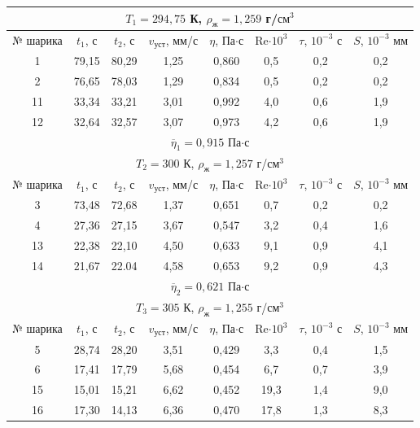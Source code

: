 \documentclass[a4paper,12pt]{article} %
\begin{document}
\begin{table}[]
    \centering
    \begin{tabular}{|c|c|c|c|c|c|c|c|} \hline
        \multicolumn{8}{|c|}{$T_1 = 294,75 $ К, $\rho_\text{ж} = 1,259$ г/$\text{см}^3$} \\ \hline
        № шарика & $t_1$, с & $t_2$, с & $v_\text{уст}$, мм/с & $\eta$, Па$\cdot$с & Re$\cdot 10^3$ & $\tau$, $10^{-3}$ с & $S$, $10^{-3}$ мм  \\ \hline
        1 & 79,15 & 80,29 & 1,25 & 0,860 & 0,5 & 0,2 & 0,2 \\ \hline
        2 & 76,65 & 78,03 & 1,29 & 0,834 & 0,5 & 0,2 & 0,2 \\ \hline
        11 & 33,34 & 33,21 & 3,01 & 0,992 & 4,0 & 0,6 & 1,9 \\ \hline
        12 & 32,64 & 32,57 & 3,07 & 0,973 & 4,2 & 0,6 & 1,9 \\ \hline
        \multicolumn{8}{|c|}{$\overline{\eta}_1 = 0,915$ Па$\cdot$с} \\ \hline
        \multicolumn{8}{|c|}{$T_2 = 300$ К, $\rho_\text{ж} = 1,257$ г/$\text{см}^3$} \\ \hline
        № шарика & $t_1$, с & $t_2$, с & $v_\text{уст}$, мм/с & $\eta$, Па$\cdot$с & Re$\cdot 10^3$ & $\tau$, $10^{-3}$ с & $S$, $10^{-3}$ мм  \\ \hline
        3 & 73,48 & 72,68 & 1,37 & 0,651 & 0,7 & 0,2 & 0,2 \\ \hline
        4 & 27,36 & 27,15 & 3,67 & 0,547 & 3,2 & 0,4 & 1,6 \\ \hline
        13 & 22,38 & 22,10 & 4,50 & 0,633 & 9,1 & 0,9 & 4,1 \\ \hline
        14 & 21,67 & 22.04 & 4,58 & 0,653 & 9,2 & 0,9 & 4,3 \\ \hline
        \multicolumn{8}{|c|}{$\overline{\eta}_2 = 0,621$ Па$\cdot$с} \\ \hline
        \multicolumn{8}{|c|}{$T_3 = 305$ К, $\rho_\text{ж} = 1,255$ г/$\text{см}^3$} \\ \hline
        № шарика & $t_1$, с & $t_2$, с & $v_\text{уст}$, мм/с & $\eta$, Па$\cdot$с & Re$\cdot 10^3$ & $\tau$, $10^{-3}$ с & $S$, $10^{-3}$ мм  \\ \hline
        5 & 28,74 & 28,20 & 3,51 & 0,429 & 3,3 & 0,4 & 1,5 \\ \hline
        6 & 17,41 & 17,79 & 5,68 & 0,454 & 6,7 & 0,7 & 3,9 \\ \hline
        15 & 15,01 & 15,21 & 6,62 & 0,452 & 19,3 & 1,4 & 9,0 \\ \hline
        16 & 17,30 & 14,13 & 6,36 & 0,470 & 17,8 & 1,3 & 8,3 \\ \hline

\end{tabular}
\end{table}
\end{document}
